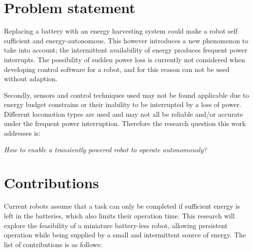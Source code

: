 \newpage

\section{Problem statement}




Replacing a battery with an energy harvesting system could make a robot self sufficient and energy-autonomous. 
This however introduces a new phenomenon to take into account; the intermittent availability of energy produces frequent power interrupts.
The possibility of sudden power loss is currently not considered when developing control software for a robot, and for this reason can not be used without adaption.
\hfill \break

Secondly, sensors and control techniques used may not be found applicable due to energy budget constrains or their inability to be interrupted by a loss of power. %
Different locomotion types are used and may not all be reliable and/or accurate under the frequent power interruption.
Therefore the research question this work addresses is:

\begin{center}
	\textit{How to enable a transiently powered robot to operate autonomously?}
\end{center}

\section{Contributions}
Current robots assume that a task can only be completed if sufficient energy is left in the batteries, which also limits their operation time. 
This research will explore the feasibility of a miniature battery-less robot, allowing persistent operation while being supplied by a small and intermittent source of energy.
The list of contributions is as follows:


